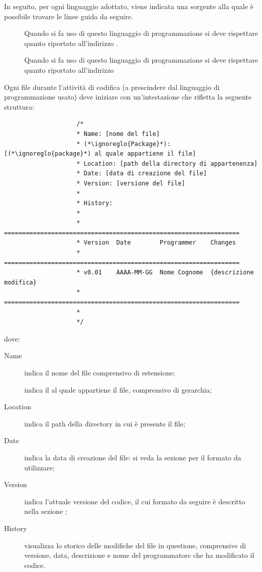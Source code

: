 				In seguito, per ogni linguaggio adottato, viene indicata una sorgente alla quale è possibile trovare le linee guida da seguire.
				\begin{description}
					\item[] Quando si fa uso di questo linguaggio di programmazione si deve rispettare quanto riportato all'indirizzo .
					\item[] Quando si fa uso di questo linguaggio di programmazione si deve rispettare quanto riportato all'indirizzo 
				\end{description}
			 \label{sec:CodificaIntestazione}
				Ogni file  durante l'attività di codifica (a prescindere dal linguaggio di programmazione usato) deve iniziare con un'intestazione che rifletta la seguente struttura:
				\begin{lstlisting}
					/*
					* Name: [nome del file]
					* (*\ignoreglo{Package}*): [(*\ignoreglo{package}*) al quale appartiene il file]
					* Location: [path della directory di appartenenza]
					* Date: [data di creazione del file]
					* Version: [versione del file]
					* 
					* History:
					* 
					* =================================================================
					* Version  Date        Programmer    Changes
					* =================================================================
					* v0.01    AAAA-MM-GG  Nome Cognome  {descrizione modifica}
					* =================================================================
					*
					*/
				\end{lstlisting}
				dove:
				\begin{description}
					\item[Name] indica il nome del file comprensivo di estensione;
					\item[] indica il  al quale appartiene il file, comprensivo di gerarchia;
					\item[Location] indica il path della directory in cui è presente il file;
					\item[Date] indica la data di creazione del file: si veda la sezione  per il formato da utilizzare;
					\item[Version] indica l'attuale versione del codice, il cui formato da seguire è descritto nella sezione ;
					\item[History] visualizza lo storico delle modifiche del file in questione, comprensive di versione, data, descrizione e nome del programmatore che ha modificato il codice.
				\end{description}
